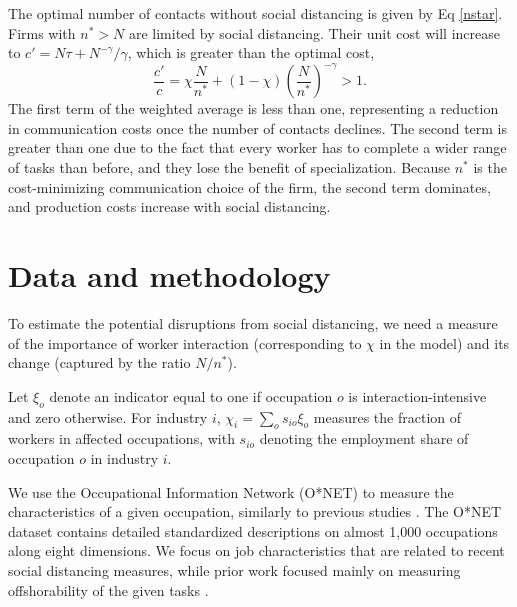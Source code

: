 The optimal number of contacts without social distancing is given by Eq \eqref{nstar}. Firms with $n^*>N$ are limited by social distancing. Their unit cost will increase to $c' = N \tau + N^{-\gamma}/\gamma$, which is greater than the optimal cost,
\begin{equation}\label{socdist}
\frac{c'}{c} 
	= \chi \frac{N}{n^*} + (1-\chi) \left(\frac{N}{n^*}\right)^{-\gamma}>1.
\end{equation}
The first term of the weighted average is less than one, representing a reduction in communication costs once the number of contacts declines. The second term is greater than one due to the fact that every worker has to complete a wider range of tasks than before, and they lose the benefit of specialization. Because $n^*$ is the cost-minimizing communication choice of the firm, the second term dominates, and production costs increase with social distancing.

\section*{Data and methodology}
To estimate the potential disruptions from social distancing, we need a measure of the importance of worker interaction (corresponding to $\chi$ in the model) and its change (captured by the ratio $N/n^*$). 

Let $\xi_o$ denote an indicator equal to one if occupation $o$ is interaction-intensive and zero otherwise. For industry $i$, $\chi_i = \sum_o s_{io}\xi_o$ measures the fraction of workers in affected occupations, with $s_{io}$ denoting the employment share of occupation $o$ in industry $i$.

We use the Occupational Information Network (O*NET) \cite{National_Center_for_ONET_Development2020-wj} to measure the characteristics of a given occupation, similarly to previous studies \cite{Firpo2011-hp,Autor2013-sh,Jin2020-tq,Dingel2020-lh,Leibovici2020-qr,Mongey2020-qc}. The O*NET dataset contains detailed standardized descriptions on almost 1,000 occupations along eight dimensions. We focus on job characteristics that are related to recent social distancing measures, while prior work focused mainly on measuring offshorability of the given tasks \cite{Firpo2011-hp,Autor2013-sh}.

